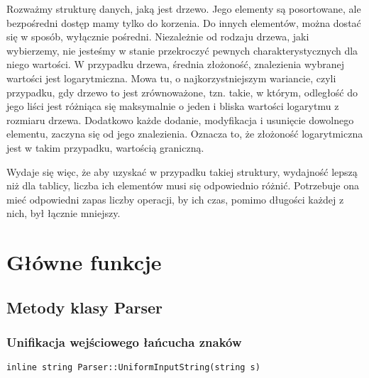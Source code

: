 \documentclass[twoside,a4paper]{book}
\begin{document}
Rozważmy strukturę danych, jaką jest drzewo. Jego elementy są posortowane, ale bezpośredni dostęp mamy tylko do korzenia. Do innych elementów, można dostać się w sposób, wyłącznie pośredni. Niezależnie od rodzaju drzewa, jaki wybierzemy, nie jesteśmy w stanie przekroczyć pewnych charakterystycznych dla niego wartości. W przypadku drzewa, średnia złożoność, znalezienia wybranej wartości jest logarytmiczna. Mowa tu, o najkorzystniejszym wariancie, czyli przypadku, gdy drzewo to jest zrównoważone, tzn. takie, w którym, odległość do jego liści jest różniąca się maksymalnie o jeden i bliska wartości logarytmu z rozmiaru drzewa. Dodatkowo każde dodanie, modyfikacja i usunięcie dowolnego elementu, zaczyna się od jego znalezienia. Oznacza to, że złożoność logarytmiczna jest w takim przypadku, wartością graniczną.

Wydaje się więc, że aby uzyskać w przypadku takiej struktury, wydajność lepszą niż dla tablicy, liczba ich elementów musi się odpowiednio różnić. Potrzebuje ona mieć odpowiedni zapas liczby operacji, by ich czas, pomimo długości każdej z nich, był łącznie mniejszy.


\section{Główne funkcje}

\subsection{Metody klasy Parser}

\subsubsection{Unifikacja wejściowego łańcucha znaków}
\begin{lstlisting}
inline string Parser::UniformInputString(string s)
\end{lstlisting}
\end{document}
